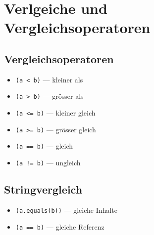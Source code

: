 \newpage
\section{Verlgeiche und Vergleichsoperatoren}

\subsection{Vergleichsoperatoren}

\begin{itemize}
	\item \lstinline{(a < b)} --- kleiner als
	\item \lstinline{(a > b)} --- grösser als
	\item \lstinline{(a <= b)} --- kleiner gleich
	\item \lstinline{(a >= b)} --- grösser gleich
	\item \lstinline{(a == b)} --- gleich
	\item \lstinline{(a != b)} --- ungleich
\end{itemize}

\subsection{Stringvergleich}

\begin{itemize}
	\item \lstinline{(a.equals(b))} --- gleiche Inhalte
	\item \lstinline{(a == b)} --- gleiche Referenz
\end{itemize}
